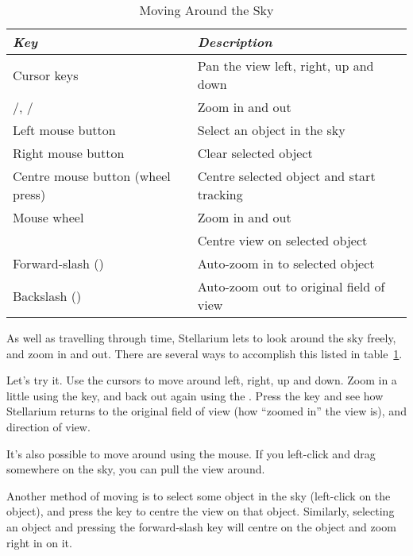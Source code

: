 \begin{table}[h]
\centering
\begin{tabular}{ll}\toprule
\emph{Key}                         & \emph{Description}\\\midrule
Cursor keys \keys{\arrowkeyleft} \keys{\arrowkeyright} \keys{\arrowkeyup} \keys{\arrowkeydown} & Pan the view left, right, up and down \\
\keyPageUp{}/\keyPageDown{}, \keys{\ctrl+\arrowkeyup}/\keys{\ctrl+\arrowkeydown} & Zoom in and out \\
Left mouse button                  & Select an object in the sky \\
Right mouse button                 & Clear selected object \\
Centre mouse button (wheel press)  & Centre selected object and start tracking \\
Mouse wheel                        & Zoom in and out \\ 
\key{\space}                       & Centre view on selected object \\
Forward-slash (\key{/})            & Auto-zoom in to selected object \\
Backslash (\key{\textbackslash{}}) & Auto-zoom out to original field of view \\
\bottomrule
\end{tabular}
\caption{Moving Around the Sky}
\label{tab:tour:moving}
\end{table}

As well as travelling through time, Stellarium lets to look around the
sky freely, and zoom in and out. There are several ways to accomplish
this listed in table~\ref{tab:tour:moving}.

Let's try it. Use the cursors to move around left, right, up and down.
Zoom in a little using the \keyPageUp{} key, and back out again using the
\keyPageDown{}. Press the \key{\textbackslash} key and see how Stellarium returns to the
original field of view (how ``zoomed in'' the view is), and direction of
view.

It's also possible to move around using the mouse. If you left-click and
drag somewhere on the sky, you can pull the view around.

Another method of moving is to select some object in the sky (left-click
on the object), and press the  key to centre the view on that
object. Similarly, selecting an object and pressing the forward-slash
key \key{/} will centre on the object and zoom right in on it.

